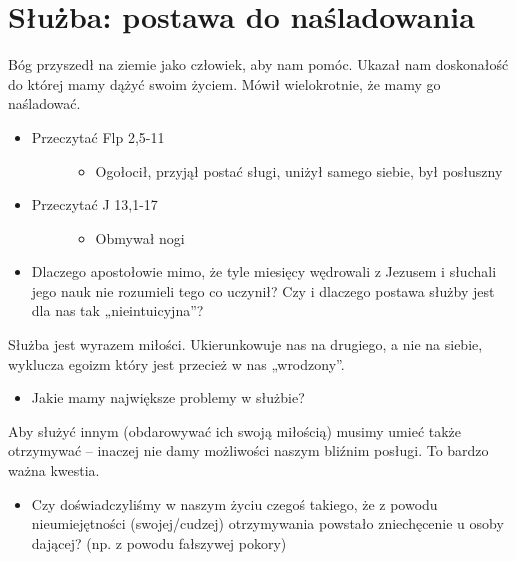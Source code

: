 \documentclass[a5paper,10pt,polish]{book}
\begin{document}
\section{Służba: postawa do naśladowania}
\label{miliardowice-2005-jesien/spotkanie1:sluzba-postawa-do-nasladowania}
Bóg przyszedł na ziemie jako człowiek, aby nam pomóc. Ukazał nam doskonałość do której mamy dążyć swoim życiem. Mówił wielokrotnie, że mamy go naśladować.
\begin{itemize}
\item {} \begin{description}
\item[{Przeczytać Flp 2,5-11}] \leavevmode\begin{itemize}
\item {} 
Ogołocił, przyjął postać sługi, uniżył samego siebie, był posłuszny

\end{itemize}

\end{description}

\item {} \begin{description}
\item[{Przeczytać J 13,1-17}] \leavevmode\begin{itemize}
\item {} 
Obmywał nogi

\end{itemize}

\end{description}

\item {} 
Dlaczego apostołowie mimo, że tyle miesięcy wędrowali z Jezusem i słuchali  jego nauk nie rozumieli tego  co uczynił? Czy i dlaczego postawa służby jest dla nas tak „nieintuicyjna”?

\end{itemize}

Służba jest wyrazem miłości. Ukierunkowuje nas na drugiego, a nie na siebie, wyklucza egoizm który jest przecież w nas „wrodzony”.
\begin{itemize}
\item {} 
Jakie mamy największe problemy w służbie?

\end{itemize}

Aby służyć innym (obdarowywać ich swoją miłością) musimy umieć także otrzymywać – inaczej nie damy możliwości naszym bliźnim posługi. To bardzo ważna kwestia.
\begin{itemize}
\item {} 
Czy doświadczyliśmy w naszym życiu czegoś takiego, że z powodu nieumiejętności (swojej/cudzej) otrzymywania powstało zniechęcenie u osoby dającej? (np. z powodu fałszywej pokory)

\end{itemize}
\end{document}
